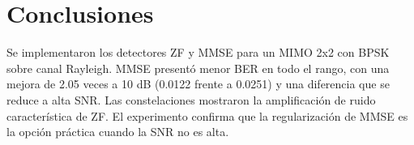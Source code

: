 \documentclass[11pt,a4paper]{article}
\begin{document}
\section{Conclusiones}

Se implementaron los detectores ZF y MMSE para un MIMO 2x2 con BPSK sobre canal Rayleigh.
MMSE presentó menor BER en todo el rango, con una mejora de 2.05 veces a 10 dB
(0.0122 frente a 0.0251) y una diferencia que se reduce a alta SNR. Las constelaciones
mostraron la amplificación de ruido característica de ZF. El experimento confirma que la
regularización de MMSE es la opción práctica cuando la SNR no es alta.
\end{document}
